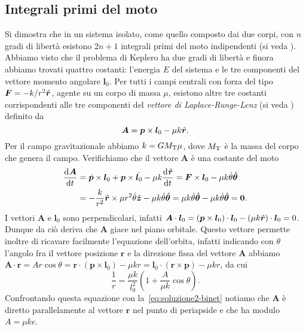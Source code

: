 {\subsection{Integrali primi del moto}
\label{sec:integrali-primi}

Si dimostra che in un sistema isolato, come quello composto dai due corpi, con
$n$ gradi di libertà esistono $2n+1$ integrali primi del moto indipendenti (si
veda \textcite{landau:meccanica}). Abbiamo visto che il problema di Keplero ha
due gradi di libertà e finora abbiamo trovati quattro costanti: l'energia $E$
del sistema e le tre componenti del vettore momento angolare $\bm{l}_0$. Per
tutti i campi centrali con forza del tipo $\bm{F} = -k/r^2\hat{\bm{r}}$, agente su
un corpo di massa $\mu$, esistono altre tre costanti corrispondenti alle tre
componenti del \emph{vettore di Laplace-Runge-Lenz} (si veda
\textcite{goldstein:meccanica}) definito da
\begin{equation}
  \bm{A} = \bm{p}\times\bm{l}_0 - \mu k\hat{\bm{r}}.
\end{equation}
Per il campo gravitazionale abbiamo $k=GM_\textup{T}\mu$, dove $M_\textup{T}$ è
la massa del corpo che genera il campo. Verifichiamo che il vettore $\bm{A}$ è
una costante del moto
\begin{equation}
  \begin{split}
    \frac{{\mathop{}\!\mathrm{d}^{}}\bm{A}}{\mathop{}\!\mathrm{d} {t}^{}} &= \dot{\bm{p}}\times\bm{l}_0 + \bm{p}\times\dot{\bm{l}_0}
    - \mu k\frac{{\mathop{}\!\mathrm{d}^{}}\hat{\bm{r}}}{\mathop{}\!\mathrm{d} {t}^{}} = \bm{F}\times\bm{l}_0 - \mu
    k\dot{\theta}\hat{\bm{\theta}} \\
    &= -\frac{k}{r^2}\hat{\bm{r}}\times \mu r^2\dot{\theta}\hat{\bm{z}} -
    \mu k\dot{\theta}\hat{\bm{\theta}} = \mu k\dot{\theta}\hat{\bm{\theta}} -
    \mu k\dot{\theta}\hat{\bm{\theta}} = \bm{0}.
  \end{split}
\end{equation}
I vettori $\bm{A}$ e $\bm{l}_0$ sono perpendicolari, infatti
$\bm{A}\cdot\bm{l}_0 = (\bm{p}\times\bm{l}_0)\cdot\bm{l}_0 - (\mu
k\hat{\bm{r}})\cdot\bm{l}_0 = 0$.
Dunque da ciò deriva che $\bm{A}$ giace nel piano orbitale. Questo vettore
permette inoltre di ricavare facilmente l'equazione dell'orbita, infatti
indicando con $\theta$ l'angolo fra il vettore posizione $\bm{r}$ e la direzione
fissa del vettore $\bm{A}$ abbiamo
$\bm{A}\cdot\bm{r} = Ar\cos\theta = \bm{r}\cdot(\bm{p}\times\bm{l}_0) - \mu kr =
\bm{l}_0\cdot(\bm{r}\times\bm{p}) - \mu kr$, da cui
\begin{equation}
  \frac{1}{r} = \frac{\mu k}{l_0^2}
  \left(
    1 + \frac{A}{\mu k}\cos\theta
  \right).
\end{equation}
Confrontando questa equazione con la~\eqref{eq:soluzione2-binet} notiamo che
$\bm{A}$ è diretto parallelamente al vettore $\bm{r}$ nel punto di periapside e
che ha modulo $A = \mu ke$.

}
